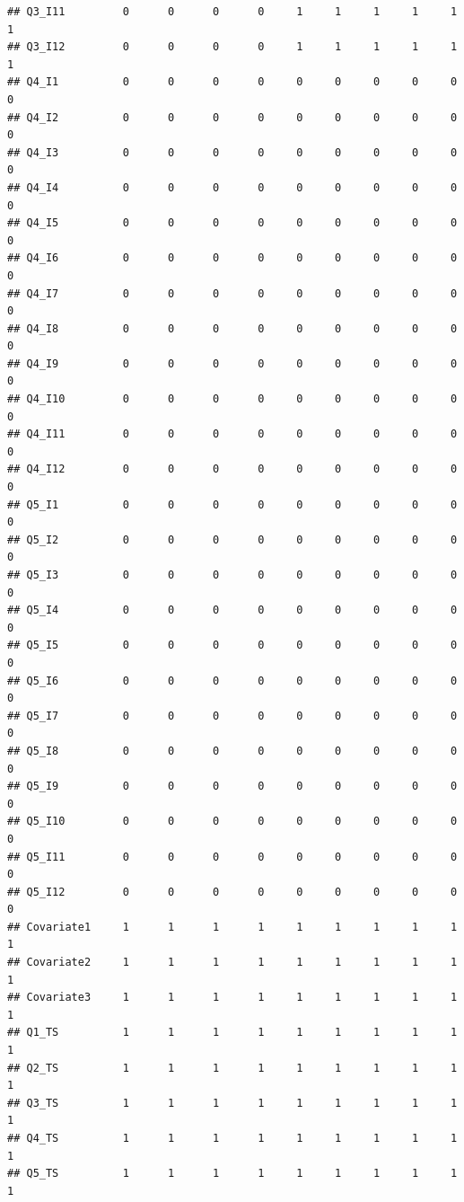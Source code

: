 \documentclass[]{book}
\begin{document}
\begin{verbatim}
## Q3_I11         0      0      0      0     1     1     1     1     1     1
## Q3_I12         0      0      0      0     1     1     1     1     1     1
## Q4_I1          0      0      0      0     0     0     0     0     0     0
## Q4_I2          0      0      0      0     0     0     0     0     0     0
## Q4_I3          0      0      0      0     0     0     0     0     0     0
## Q4_I4          0      0      0      0     0     0     0     0     0     0
## Q4_I5          0      0      0      0     0     0     0     0     0     0
## Q4_I6          0      0      0      0     0     0     0     0     0     0
## Q4_I7          0      0      0      0     0     0     0     0     0     0
## Q4_I8          0      0      0      0     0     0     0     0     0     0
## Q4_I9          0      0      0      0     0     0     0     0     0     0
## Q4_I10         0      0      0      0     0     0     0     0     0     0
## Q4_I11         0      0      0      0     0     0     0     0     0     0
## Q4_I12         0      0      0      0     0     0     0     0     0     0
## Q5_I1          0      0      0      0     0     0     0     0     0     0
## Q5_I2          0      0      0      0     0     0     0     0     0     0
## Q5_I3          0      0      0      0     0     0     0     0     0     0
## Q5_I4          0      0      0      0     0     0     0     0     0     0
## Q5_I5          0      0      0      0     0     0     0     0     0     0
## Q5_I6          0      0      0      0     0     0     0     0     0     0
## Q5_I7          0      0      0      0     0     0     0     0     0     0
## Q5_I8          0      0      0      0     0     0     0     0     0     0
## Q5_I9          0      0      0      0     0     0     0     0     0     0
## Q5_I10         0      0      0      0     0     0     0     0     0     0
## Q5_I11         0      0      0      0     0     0     0     0     0     0
## Q5_I12         0      0      0      0     0     0     0     0     0     0
## Covariate1     1      1      1      1     1     1     1     1     1     1
## Covariate2     1      1      1      1     1     1     1     1     1     1
## Covariate3     1      1      1      1     1     1     1     1     1     1
## Q1_TS          1      1      1      1     1     1     1     1     1     1
## Q2_TS          1      1      1      1     1     1     1     1     1     1
## Q3_TS          1      1      1      1     1     1     1     1     1     1
## Q4_TS          1      1      1      1     1     1     1     1     1     1
## Q5_TS          1      1      1      1     1     1     1     1     1     1

\end{verbatim}
\end{document}
